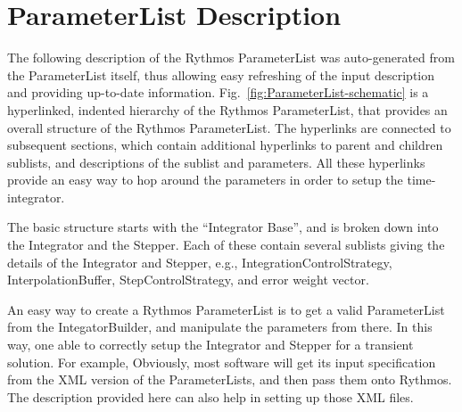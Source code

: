 \cleardoublepage{}

\section{ParameterList Description}

The following description of the Rythmos ParameterList was auto-generated
from the ParameterList itself, thus allowing easy refreshing of the
input description and providing up-to-date information. Fig.~\ref{fig:ParameterList-schematic}
is a hyperlinked, indented hierarchy of the Rythmos ParameterList,
that provides an overall structure of the Rythmos ParameterList. The
hyperlinks are connected to subsequent sections, which contain additional
hyperlinks to parent and children sublists, and descriptions of the
sublist and parameters. All these hyperlinks provide an easy way to
hop around the parameters in order to setup the time-integrator. 

The basic structure starts with the ``Integrator Base'', and is
broken down into the Integrator and the Stepper. Each of these contain
several sublists giving the details of the Integrator and Stepper,
e.g., IntegrationControlStrategy, InterpolationBuffer, StepControlStrategy,
and error weight vector.

An easy way to create a Rythmos ParameterList is to get a valid ParameterList
from the IntegatorBuilder, and manipulate the parameters from there.
In this way, one able to correctly setup the Integrator and Stepper
for a transient solution. For example, 
Obviously, most software will get its input specification from the
XML version of the ParameterLists, and then pass them onto Rythmos.
The description provided here can also help in setting up those XML
files. 


